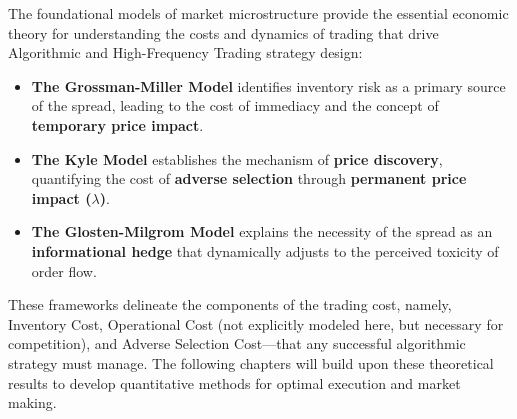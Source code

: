 The foundational models of market microstructure provide the essential economic theory for understanding the costs and dynamics of trading that drive Algorithmic and High-Frequency Trading strategy design:

\begin{itemize}
    \item \textbf{The Grossman-Miller Model} identifies inventory risk as a primary source of the spread, leading to the cost of immediacy and the concept of \textbf{temporary price impact}.
    \item \textbf{The Kyle Model} establishes the mechanism of \textbf{price discovery}, quantifying the cost of \textbf{adverse selection} through \textbf{permanent price impact ($\lambda$)}.
    \item \textbf{The Glosten-Milgrom Model} explains the necessity of the spread as an \textbf{informational hedge} that dynamically adjusts to the perceived toxicity of order flow.
\end{itemize}
These frameworks delineate the components of the trading cost, namely, Inventory Cost, Operational Cost (not explicitly modeled here, but necessary for competition), and Adverse Selection Cost—that any successful algorithmic strategy must manage. The following chapters will build upon these theoretical results to develop quantitative methods for optimal execution and market making.
